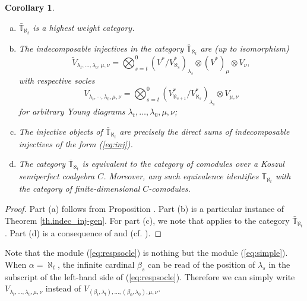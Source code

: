 \documentclass[11pt]{article}
\theoremstyle{plain}
\newtheorem{corollary}[lemma]{Corollary}
\theoremstyle{nonumberplain}
\theoremstyle{plain}
\theoremstyle{nonumberplain}
\newtheorem{proof}{Proof}
\newcommand\bT{\mathbb T}
\newcommand\al{\aleph}
\begin{document}
\begin{corollary}\label{cor.bigone}
  \begin{enumerate}[(a)]
  	\item $\bar{\bT}_{\aleph_t}$ is a
  highest weight category.
  	\item The indecomposable injectives in the category $\bar{\bT}_{\al_t}$ are (up to isomorphism)
  \begin{equation}\label{eq:inj}
   \tilde{V}_{\lambda_t,\ldots,\lambda_0,\mu,\nu}=\bigotimes_{s=t}^0(V^*/V^*_{\al_s})_{\lambda_s} \otimes (V^*)_{\mu}\otimes V_{\nu},
  \end{equation}
with respective socles 
  \begin{equation}\label{eq:respsocle}
    V_{\lambda_t,\cdots,\lambda_0,\mu,\nu}=\bigotimes_{s=t}^0(V^*_{\al_{s+1}}/V^*_{\al_s})_{\lambda_s} \otimes V_{\mu,\nu}
  \end{equation}
   for arbitrary Young diagrams $\lambda_t,\ldots,\lambda_0,\mu,\nu$;
  \item The injective objects {of $\bar{\bT}_{\aleph_t}$} are precisely the direct sums
  of indecomposable injectives of the form (\ref{eq:inj}).
  
  \item The category $\overline{\bT}_{\aleph_t}$ is equivalent to {the category} of
  comodules over a Koszul semiperfect coalgebra $C$. Moreover, any
  such equivalence identifies $\bT_{\aleph_t}$ {with} the category of
  finite-dimensional $C$-comodules. 
  \end{enumerate}
\end{corollary}

\begin{proof}
	Part (a) follows from Proposition .  Part (b) is a particular instance of Theorem \ref{th.indec_inj-gen}.  For part (c), we note that   applies to the
  category $\bar{\bT}_{\aleph_t}$.  Part (d) is a consequence of  and
\cite[Theorem 2.13]{us} (cf. \cite[Corollary 3.17]{us}).
\end{proof}


Note that the module (\ref{eq:respsocle}) is nothing but the module (\ref{eq:simple}).  When $\alpha=\aleph_t$, the infinite cardinal $\beta_s$ can be read of the position of $\lambda_s$ in the subscript of the left-hand side of (\ref{eq:respsocle}).  Therefore we can simply write $V_{\lambda_t,\ldots,\lambda_0,\mu,\nu}$ instead of $V_{\left(\beta_t,\lambda_t\right),\ldots,\left(\beta_0,\lambda_0\right),\mu,\nu}$.
\end{document}
